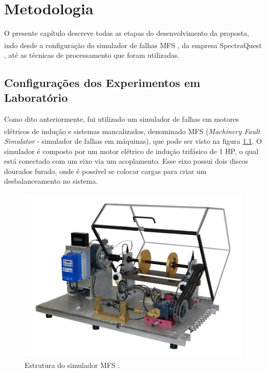
\chapter{Metodologia}

O presente capítulo descreve todas as etapas do desenvolvimento da proposta, indo desde a configuração do simulador de falhas MFS \textsuperscript \textregistered, da
empresa SpectraQuest \textsuperscript \textregistered, até as técnicas de processamento que foram utilizadas.

% 

\section{Configurações dos Experimentos em Laboratório}

Como dito anteriormente, fui utilizado um simulador de falhas em motores elétricos de indução e sistemas mancalizados, denominado
MFS \textsuperscript \textregistered (\textit{Machinery Fault Simulator} - simulador de falhas em máquinas), que pode ser visto na figura \ref{fig:real_plant}. O
simulador é composto por um motor elétrico de indução trifásico de 1 HP, o qual está conectado com um eixo via um acoplamento.
Esse eixo possui dois discos dourados furado, onde é possível se colocar cargas para criar um desbalanceamento no sistema.

\begin{figure}[H]
    \caption{Estrutura do simulador MFS \textsuperscript \textregistered.}
    \begin{center}
        \includegraphics[scale=.4]{metodologia/img/real_plant.jpeg}
    \end{center}
    \label{fig:real_plant}
\end{figure}

